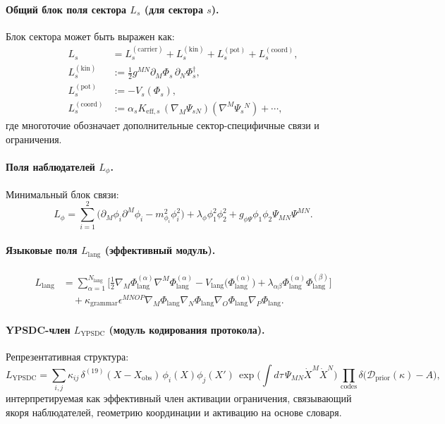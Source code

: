 \documentclass[11pt,a4paper]{article}
\begin{document}
	\paragraph{Общий блок поля сектора $L_s$ (для сектора $s$).}
	Блок сектора может быть выражен как:
	\begin{align}
		L_s &= L^{(\mathrm{carrier})}_s + L^{(\mathrm{kin})}_s + L^{(\mathrm{pot})}_s + L^{(\mathrm{coord})}_s, \\
		L^{(\mathrm{kin})}_s &:= \frac{1}{2}g^{MN}\partial_M\Phi_s\,\partial_N\Phi_s^\dagger, \\
		L^{(\mathrm{pot})}_s &:= -V_s(\Phi_s), \\
		L^{(\mathrm{coord})}_s &:= \alpha_s K_{\mathrm{eff},s}\,(\nabla_M\Psi_{sN})(\nabla^M\Psi_{s}{}^{N}) + \cdots,
	\end{align}
	где многоточие обозначает дополнительные сектор-специфичные связи и ограничения.
	
	\paragraph{Поля наблюдателей $L_{\phi}$.}
	Минимальный блок связи:
	\begin{equation}
		L_{\phi}=\sum_{i=1}^{2}\Big(\partial_M\phi_i\partial^M\phi_i - m_{\phi_i}^2\phi_i^2\Big) + \lambda_{\phi}\phi_1^2\phi_2^2 + g_{\phi\Psi}\phi_1\phi_2\Psi_{MN}\Psi^{MN}.
	\end{equation}
	
	\paragraph{Языковые поля $L_{\mathrm{lang}}$ (эффективный модуль).}
	\begin{align}
		L_{\mathrm{lang}} &= \sum_{\alpha=1}^{N_{\mathrm{lang}}}\Big[
		\frac{1}{2}\nabla_M\Phi_{\mathrm{lang}}^{(\alpha)}\nabla^M\Phi_{\mathrm{lang}}^{(\alpha)}
		- V_{\mathrm{lang}}\big(\Phi_{\mathrm{lang}}^{(\alpha)}\big)
		+ \lambda_{\alpha\beta}\Phi_{\mathrm{lang}}^{(\alpha)}\Phi_{\mathrm{lang}}^{(\beta)}
		\Big] \nonumber\\
		&\quad + \kappa_{\mathrm{grammar}}\epsilon^{MNOP}\nabla_M\Phi_{\mathrm{lang}}\nabla_N\Phi_{\mathrm{lang}}\nabla_O\Phi_{\mathrm{lang}}\nabla_P\Phi_{\mathrm{lang}}.
	\end{align}
	
	\paragraph{YPSDC-член $L_{\mathrm{YPSDC}}$ (модуль кодирования протокола).}
	Репрезентативная структура:
	\begin{equation}
		L_{\mathrm{YPSDC}} = \sum_{i,j}\kappa_{ij}\,\delta^{(19)}(X-X_{\mathrm{obs}})\,\phi_i(X)\phi_j(X')\,
		\exp\!\Big(\int d\tau\,\Psi_{MN}\dot X^M\dot X^N\Big)\,
		\prod_{\mathrm{codes}}\delta\big(\mathcal{D}_{\mathrm{prior}}(\kappa)-A\big),
	\end{equation}
	интерпретируемая как эффективный член активации ограничения, связывающий якоря наблюдателей, геометрию координации и активацию на основе словаря.
	
\end{document}
